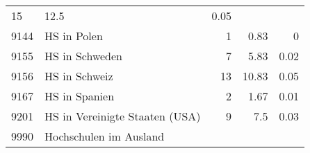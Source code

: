 \begin{longtable}{lXrrr}
       \num{15} &
       \num[round-mode=places,round-precision=2]{12,5} &
         \num[round-mode=places,round-precision=2]{0,05} \\

     9144 &
     \multicolumn{1}{X}{ HS in Polen   } &


       \num{1} &
       \num[round-mode=places,round-precision=2]{0,83} &
         \num[round-mode=places,round-precision=2]{0} \\

     9155 &
     \multicolumn{1}{X}{ HS in Schweden   } &


       \num{7} &
       \num[round-mode=places,round-precision=2]{5,83} &
         \num[round-mode=places,round-precision=2]{0,02} \\

     9156 &
     \multicolumn{1}{X}{ HS in Schweiz   } &


       \num{13} &
       \num[round-mode=places,round-precision=2]{10,83} &
         \num[round-mode=places,round-precision=2]{0,05} \\

     9167 &
     \multicolumn{1}{X}{ HS in Spanien   } &


       \num{2} &
       \num[round-mode=places,round-precision=2]{1,67} &
         \num[round-mode=places,round-precision=2]{0,01} \\

     9201 &
     \multicolumn{1}{X}{ HS in Vereinigte Staaten (USA)   } &


       \num{9} &
       \num[round-mode=places,round-precision=2]{7,5} &
         \num[round-mode=places,round-precision=2]{0,03} \\

     9990 &
     \multicolumn{1}{X}{ Hochschulen im Ausland   } &



\end{longtable}
